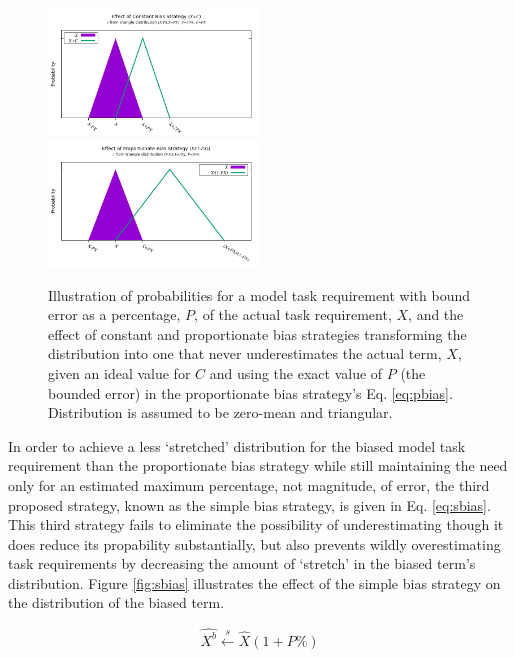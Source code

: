 \documentclass[10pt]{csce}
\begin{document}
\begin{figure}
	\begin{center}
		\includegraphics[width=0.5\textwidth]{figures/BiasVisualization_Constant.pdf}
		\includegraphics[width=0.5\textwidth]{figures/BiasVisualization_Proportionate.pdf}
	\end{center}
	\caption{Illustration of probabilities for a model task requirement
		with bound error as a percentage, $P$, of the actual task
		requirement, $X$, and the effect of constant and proportionate
		bias strategies transforming the distribution into
		one that never underestimates the actual term, $X$, given an
		ideal value for $C$ and using the exact value of $P$ (the bounded
		error) in the proportionate bias strategy's Eq. \ref{eq:pbias}.
		Distribution is assumed to be zero-mean and triangular.}
	\label{fig:cpbias}
\end{figure}

In order to achieve a less `stretched' distribution for the biased model task
requirement than the proportionate bias strategy while still maintaining the
need only for an estimated maximum percentage, not magnitude, of error, the
third proposed strategy, known as the simple bias strategy, is given in Eq.
\ref{eq:sbias}. This third strategy fails to eliminate the possibility of
underestimating though it does reduce its propability substantially, but also
prevents wildly overestimating task requirements by decreasing the amount of
`stretch' in the biased term's distribution.  Figure \ref{fig:sbias}
illustrates the effect of the simple bias strategy on the distribution of the
biased term.

\begin{equation}
\hat{X^b} \xleftarrow{s} \hat{X} (1 + P\%)
\label{eq:sbias}
\end{equation}
\end{document}
